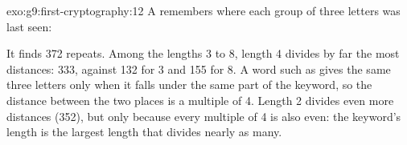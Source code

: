 \begin{solution}{exo:g9:first-cryptography:12}
A  remembers where each group of three letters was last seen:

\label{lst:g9:first-cryptography:sol-repeats}

It finds 372 repeats. Among the lengths 3 to 8, length 4 divides by far the most
distances: 333, against 132 for 3 and 155 for 8. A word such as  gives
the same three  letters only when it falls under the same part of the
keyword, so the distance between the two places is a multiple of 4. Length 2
divides even more distances (352), but only because every multiple of 4 is also
even: the keyword's length is the largest length that divides nearly as many.
\end{solution}

